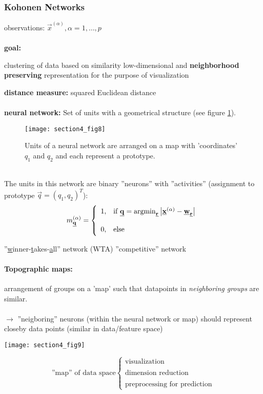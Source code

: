 
\subsubsection{Kohonen Networks}
observations: $\vec{x}^{(\alpha)}, \alpha = 1, \ldots, p$
\\\\
\textbf{goal:}
\begin{itemize}
  \itl clustering of data based on similarity \itl low-dimensional and
  \textbf{neighborhood preserving} representation for the purpose of
  visualization
\end{itemize}
\textbf{distance measure:} squared Euclidean distance
\\\\
\textbf{neural network:} Set of units with a geometrical structure (see figure \ref{fig:topographicMap}). 
\begin{figure}[h]
  \centering
  \texttt{[image: section4\_fig8]}  
  \caption{Units of a neural network are arranged on a map with 'coordinates' $q_1$ and $q_2$ and each represent a prototype.}
  \label{fig:topographicMap}
\end{figure}
\\
The units in this network are binary ''neurons'' with ''activities'' (assignment to prototype $\vec q = (q_1, q_2)^T$):
\begin{equation}
	m_{\vec{q}}^{(\alpha)} = \left\{ \begin{array}{ll}
		1, & \text{if } \vec q = \argmin_{\vec r} \big| \vec{x}^{(\alpha)}
			-\vec{w}_{\vec r} \big| \\\\
		0, & \text{else}
	\end{array} \right.
\end{equation}
\begin{itemize}
	\itR ''\underline{w}inner-\underline{t}akes-\underline{a}ll'' network
		(WTA)
	\itR ''competitive'' network
\end{itemize}

\paragraph{Topographic maps:}
\label{sec:topographic-maps}
arrangement of groups on a 'map' such that datapoints in
\emph{neighboring groups} are similar. 
\\\\
$\rightarrow$ ''neigboring'' neurons (within the neural network or map) should represent closeby data points (similar in data/feature space)
\begin{center}\texttt{[image: section4\_fig9]}
\end{center}
\[ \text{''map'' of data space} \left\{ \begin{array}{ll}
	\text{visualization} \\\\
	\text{dimension reduction} \\\\
	\text{preprocessing for prediction}
\end{array}\right. \]
\\\\
